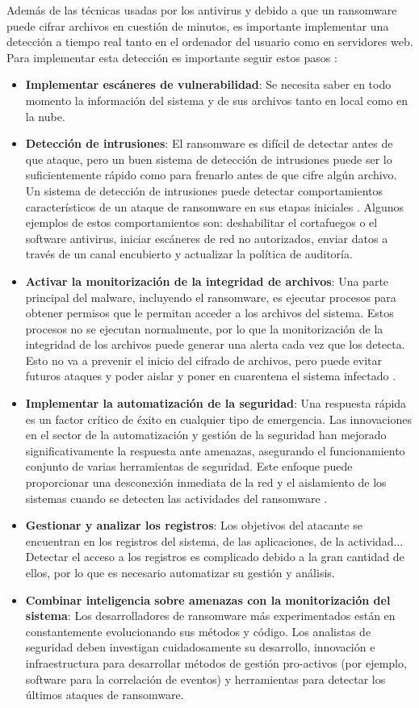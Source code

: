 Además de las técnicas usadas por los antivirus y debido a que un ransomware puede cifrar archivos en cuestión de minutos, es importante implementar una detección a tiempo real tanto en el ordenador del usuario como en servidores web. Para implementar esta detección es importante seguir estos pasos \cite{74}:
\begin{itemize}
\item \textbf{Implementar escáneres de vulnerabilidad}: Se necesita saber en todo momento la información del sistema y de sus archivos tanto en local como en la nube. 
\item \textbf{Detección de intrusiones}: El ransomware es difícil de detectar antes de que ataque, pero un buen sistema de detección de intrusiones puede ser lo suficientemente rápido como para frenarlo antes de que cifre algún archivo. Un sistema de detección de intrusiones puede detectar comportamientos característicos de un ataque de ransomware en sus etapas iniciales \cite{107}. Algunos ejemplos de estos comportamientos son: deshabilitar el cortafuegos o el software antivirus, iniciar escáneres de red no autorizados, enviar datos a través de un canal encubierto y actualizar la política de auditoría.
\item \textbf{Activar la monitorización de la integridad de archivos}: Una parte principal del malware, incluyendo el ransomware, es ejecutar procesos para obtener permisos que le permitan acceder a los archivos del sistema. Estos procesos no se ejecutan normalmente, por lo que la monitorización de la integridad de los archivos puede generar una alerta cada vez que los detecta. Esto no va a prevenir el inicio del cifrado de archivos, pero puede evitar futuros ataques y poder aislar y poner en cuarentena el sistema infectado \cite{108}.
\item \textbf{Implementar la automatización de la seguridad}: Una respuesta rápida es un factor crítico de éxito en cualquier tipo de emergencia. Las innovaciones en el sector de la automatización y gestión de la seguridad han mejorado significativamente la respuesta ante amenazas, asegurando el funcionamiento conjunto de varias herramientas de seguridad. Este enfoque puede proporcionar una desconexión inmediata de la red y el aislamiento de los sistemas cuando se detecten las actividades del ransomware \cite{109}.
\item \textbf{Gestionar y analizar los registros}: Los objetivos del atacante se encuentran en los registros del sistema, de las aplicaciones, de la actividad... Detectar el acceso a los registros es complicado debido a la gran cantidad de ellos, por lo que es necesario automatizar su gestión y análisis.
\item \textbf{Combinar inteligencia sobre amenazas con la monitorización del sistema}: Los desarrolladores de ransomware más experimentados están en constantemente evolucionando sus métodos y código. Los analistas de seguridad deben investigan cuidadosamente su desarrollo, innovación e infraestructura para desarrollar métodos de gestión pro-activos (por ejemplo, software para la correlación de eventos) y herramientas para detectar los últimos ataques de ransomware.
\end{itemize}

